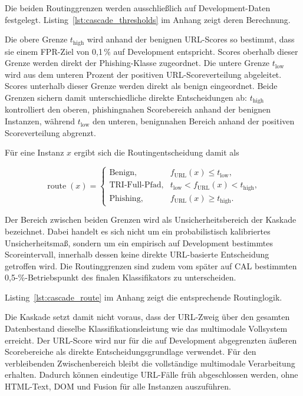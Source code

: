 Die beiden Routinggrenzen werden ausschließlich auf Development-Daten festgelegt.
Listing~\ref{lst:cascade_thresholds} im Anhang zeigt deren Berechnung.

Die obere Grenze $t_{\mathrm{high}}$ wird anhand der benignen URL-Scores so bestimmt, dass
sie einem FPR-Ziel von 0,1\,\% auf Development entspricht. Scores oberhalb dieser Grenze
werden direkt der Phishing-Klasse zugeordnet. Die untere Grenze $t_{\mathrm{low}}$ wird aus
dem unteren Prozent der positiven URL-Scoreverteilung abgeleitet. Scores unterhalb dieser
Grenze werden direkt als benign eingeordnet. Beide Grenzen sichern damit unterschiedliche
direkte Entscheidungen ab: $t_{\mathrm{high}}$ kontrolliert den oberen, phishingnahen
Scorebereich anhand der benignen Instanzen, während $t_{\mathrm{low}}$ den unteren,
benignnahen Bereich anhand der positiven Scoreverteilung abgrenzt.

Für eine Instanz $x$ ergibt sich die Routingentscheidung damit als

\[
\operatorname{route}(x)=
\begin{cases}
\text{Benign}, &
f_{\mathrm{URL}}(x)\leq t_{\mathrm{low}},\\[3pt]
\text{TRI-Full-Pfad}, &
t_{\mathrm{low}} < f_{\mathrm{URL}}(x) < t_{\mathrm{high}},\\[3pt]
\text{Phishing}, &
f_{\mathrm{URL}}(x)\geq t_{\mathrm{high}}.
\end{cases}
\]

Der Bereich zwischen beiden Grenzen wird als Unsicherheitsbereich der Kaskade bezeichnet.
Dabei handelt es sich nicht um ein probabilistisch kalibriertes Unsicherheitsmaß, sondern um
ein empirisch auf Development bestimmtes Scoreintervall, innerhalb dessen keine direkte
URL-basierte Entscheidung getroffen wird. Die Routinggrenzen sind zudem vom später auf CAL
bestimmten 0,5-\%-Betriebspunkt des finalen Klassifikators zu unterscheiden.

Listing~\ref{lst:cascade_route} im Anhang zeigt die entsprechende Routinglogik.

Die Kaskade setzt damit nicht voraus, dass der URL-Zweig über den gesamten Datenbestand
dieselbe Klassifikationsleistung wie das multimodale Vollsystem erreicht. Der URL-Score wird
nur für die auf Development abgegrenzten äußeren Scorebereiche als direkte
Entscheidungsgrundlage verwendet. Für den verbleibenden Zwischenbereich bleibt die
vollständige multimodale Verarbeitung erhalten. Dadurch können eindeutige URL-Fälle früh
abgeschlossen werden, ohne HTML-Text, DOM und Fusion für alle Instanzen auszuführen.

